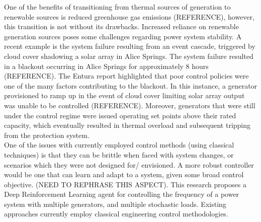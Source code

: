 \documentclass[12pt, a4paper]{article}
\begin{document}
One of the benefits of transitioning from thermal sources of generation to renewable sources is reduced greenhouse gas emissions (REFERENCE), however, this transition is not without its drawbacks. Increased reliance on renewable generation sources poses some challenges regarding power system stability. A recent example is the system failure resulting from an event cascade, triggered by cloud cover shadowing a solar array in Alice Springs. The system failure resulted in a blackout occurring in Alice Springs for approximately 8 hours (REFERENCE). The Entura report highlighted that poor control policies were one of the many factors contributing to the blackout. In this instance, a generator provisioned to ramp up in the event of cloud cover limiting solar array output was unable to be controlled (REFERENCE). Moreover, generators that were still under the control regime were issued operating set points above their rated capacity, which eventually resulted in thermal overload and subsequent tripping from the protection system.\\

One of the issues with currently employed control methods (using classical techniques) is that they can be brittle when faced with system changes, or scenarios which they were not designed for/ envisioned. A more robust controller would be one that can learn and adapt to a system, given some broad control objective. (NEED TO REPHRASE THIS ASPECT). This research proposes a Deep Reinforcement Learning agent for controlling the frequency of a power system with multiple generators, and multiple stochastic loads. Existing approaches currently employ classical engineering control methodologies.

\clearpage
\end{document}
